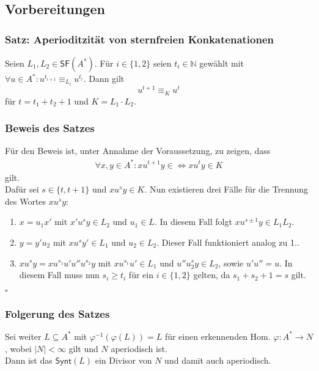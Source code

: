 \documentclass[12pt, german]{article}
\newcommand{\N}{\mathbb{N}}
\newcommand{\inv}{^{-1}}
\newcommand{\starfree}{\mathsf{SF}}
\newcommand{\synt}{\mathsf{Synt}}
\newcommand{\aast}{A^{\ast}}
\newcommand{\bewiesen}{
	
	\begin{flushright}
		$\square$  \\
\end{flushright}}
\begin{document}
	\subsection{Vorbereitungen}
	\subsubsection{Satz: Aperioditzität von sternfreien Konkatenationen}
	\label{sec:aperiodisch_konkat}
	Seien $L_1, L_2 \in \starfree(\aast)$.
	Für $i \in \{1,2\}$ seien
	 $t_i \in \N$ gewählt mit $\forall u \in \aast: u^{t_{i +1}} \equiv_{L_i} u^{t_i}$.
	Dann gilt $$u^{t+1} \equiv_K u^t$$ für $t = t_1 +t _2 +1$ und $K = L_1 \cdot L_2$.
	
	\subsubsection{Beweis des Satzes}
	Für den Beweis ist, unter Annahme der Voraussetzung, zu zeigen, dass
	\begin{align*}
		\forall x,y \in \aast: xu^{t+1}y \in \iff  xu^{t}y \in K
	\end{align*}
	gilt.\\
	
	Dafür sei $s \in \{t, t+1\}$ und $xu^sy \in K$. Nun existieren drei Fälle für die Trennung des Wortes $xu^sy$: 
	\begin{enumerate}[label= \arabic*.]
		\item $x=u_1x'$ mit $x'u^sy \in L_2$ und $u_1 \in L$. In diesem Fall folgt $xu^{s\pm1}y \in L_1L_2$. 
		\item $y = y'u_2$ mit $xu^sy' \in L_1$ und  $u_2 \in L_2$. Dieser Fall funktioniert analog zu 1..
		\item $xu^sy = xu^{s_1}u'u''u^{s_2}y$ mit $xu^{s_1}u' \in L_1$ und $u''u^s_2y \in L_2$, sowie $u'u'' = u$. In diesem Fall muss nun $s_i \geq t_i$ für ein $i \in \{1,2\}$ gelten, da $s_1 + s_2 + 1 = s$ gilt.
	\end{enumerate}
	
	\bewiesen
	
	\subsubsection{Folgerung des Satzes}
	Sei weiter $L \subseteq \aast$ mit $\varphi\inv(\varphi(L))= L$ für einen erkennenden Hom. $\varphi: \aast \to N$, wobei $|N| < \infty$ gilt und $N$ aperiodisch ist. \\
	Dann ist das $\synt(L)$ ein Divisor von $N$ und damit auch aperiodisch. 
	
\end{document}

